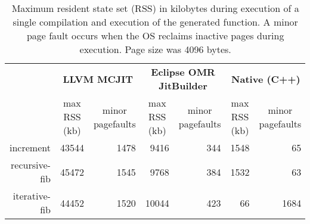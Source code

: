 \begin{table*}[t]
  \begin{tabular}{|r|l|l|l|l|l|l|}
  \hline
  
  \multicolumn{1}{|l|}{\multirow{2}{*}{}} 
  & \multicolumn{2}{c|}{\textbf{LLVM MCJIT}}                                                                                    
  & \multicolumn{2}{c|}{\textbf{Eclipse OMR JitBuilder}}                                                                
  & \multicolumn{2}{c|}{\textbf{Native (C++)}}                                                                              
  \\ \cline{2-7}
  
  \multicolumn{1}{|c|}{\textbf{Program}}  
  & \multicolumn{1}{c|}{max RSS (kb)}  %
  & \multicolumn{1}{c|}{minor pagefaults}  %
  & \multicolumn{1}{c|}{max RSS (kb)}      %
  & \multicolumn{1}{c|}{minor pagefaults}  %
  & \multicolumn{1}{c|}{max RSS (kb)}      %
  & \multicolumn{1}{c|}{minor pagefaults}  %
  
  \\ \hline

  increment                               
  & \multicolumn{1}{r|}{\num{43544}} %
  & \multicolumn{1}{r|}{\num{1478}} %
  & \multicolumn{1}{r|}{\num{9416}} %
  & \multicolumn{1}{r|}{\num{344}} %
  & \multicolumn{1}{r|}{\num{1548}}    %
  & \multicolumn{1}{r|}{\num{65}}    %
  \\ \hline
  
  recursive-fib                           
  & \multicolumn{1}{r|}{\num{45472}} %
  & \multicolumn{1}{r|}{\num{1545}} %
  & \multicolumn{1}{r|}{\num{9768}} %
  & \multicolumn{1}{r|}{\num{384}} %
  & \multicolumn{1}{r|}{\num{1532}}   %
  & \multicolumn{1}{r|}{\num{63}}   %
  \\ \hline
  
  iterative-fib                           
  & \multicolumn{1}{r|}{\num{44452}} %
  & \multicolumn{1}{r|}{\num{1520}} %
  & \multicolumn{1}{r|}{\num{10044}} %
  & \multicolumn{1}{r|}{\num{423}} %
  & \multicolumn{1}{r|}{\num{66}}   %
  & \multicolumn{1}{r|}{\num{1684}}   %
  \\ \hline
  
\end{tabular}
  \caption{Maximum resident state set (RSS) in kilobytes during execution of a single compilation and execution of the generated function. A minor page fault occurs when the OS reclaims inactive pages during execution. Page size was 4096 bytes.}
  \label{tab:max_rss}
\end{table*}

